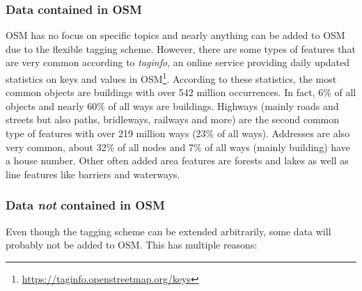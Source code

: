 		\subsubsection{Data contained in OSM}
		
			OSM has no focus on specific topics and nearly anything can be added to OSM due to the flexible tagging scheme.
			However, there are some types of features that are very common according to \emph{taginfo}, an online service providing daily updated statistics on keys and values in OSM\footnote{\url{https://taginfo.openstreetmap.org/keys}}.
			According to these statistics, the most common objects are buildings with over 542 million occurrences.
			In fact, 6\% of all objects and nearly 60\% of all ways are buildings.
			Highways (mainly roads and streets but also paths, bridleways, railways and more) are the second common type of features with over 219 million ways (23\% of all ways).
			Addresses are also very common, about 32\% of all nodes and 7\% of all ways (mainly building) have a house number.
			Other often added area features are forests and lakes as well as line features like barriers and waterways.
			
		\subsubsection{Data \textit{not} contained in OSM}
		\label{subsubsec:data-not-in-osm}
		
			Even though the tagging scheme can be extended arbitrarily, some data will probably not be added to OSM.
			This has multiple reasons:
			

